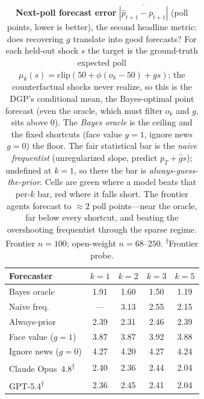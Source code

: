 \documentclass{article} %
\begin{document}
\begin{table}[t]
\centering
\caption{\textbf{Next-poll forecast error} $\overline{|\hat p_{t+1}-p_{t+1}|}$ (poll points, lower is better), the second headline metric: does recovering $g$ translate into good forecasts? For each held-out shock $s$ the target is the ground-truth expected poll $\mu_k(s){=}\mathrm{clip}(50+\phi(o_k{-}50)+g s)$; the counterfactual shocks never realize, so this is the DGP's conditional mean, the Bayes-optimal point forecast (even the oracle, which must filter $o_k$ and $g$, sits above $0$). The \emph{Bayes oracle} is the ceiling and the fixed shortcuts (face value $g{=}1$, ignore news $g{=}0$) the floor. The fair statistical bar is the \emph{naive frequentist} (unregularized slope, predict $p_T{+}\hat g s$); undefined at $k{=}1$, so there the bar is \emph{always-guess-the-prior}. Cells are \colorbox{green!22}{green} where a model beats that per-$k$ bar, \colorbox{red!18}{red} where it falls short. The frontier agents forecast to $\approx2$ poll points---near the oracle, far below every shortcut, and beating the overshooting frequentist through the sparse regime. Frontier $n{=}100$; open-weight $n{=}68\text{--}250$.  \textsuperscript{$\dagger$}Frontier probe.}
\label{tab:exp2-poll}
\footnotesize
\begin{tabular}{l@{\hskip 6pt}cccc}
\toprule
\textbf{Forecaster} & $k{=}1$ & $k{=}2$ & $k{=}3$ & $k{=}5$ \\
\midrule
Bayes oracle & 1.91 & 1.60 & 1.50 & 1.19 \\
Naive freq. & --- & 3.13 & 2.55 & 2.15 \\
Always-prior & 2.39 & 2.31 & 2.46 & 2.39 \\
Face value ($g{=}1$) & 3.87 & 3.87 & 3.92 & 3.88 \\
Ignore news ($g{=}0$) & 4.27 & 4.20 & 4.27 & 4.24 \\
\midrule
Claude Opus~4.8\textsuperscript{$\dagger$} & \cellcolor{red!18}2.40 & \cellcolor{green!22}2.36 & \cellcolor{green!22}2.44 & \cellcolor{green!22}2.04 \\
GPT-5.4\textsuperscript{$\dagger$} & \cellcolor{green!22}2.36 & \cellcolor{green!22}2.45 & \cellcolor{green!22}2.41 & \cellcolor{green!22}2.04 \\

\end{tabular}
\end{table}
\end{document}
